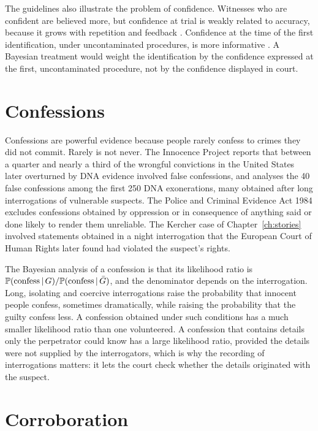 The guidelines also illustrate the problem of confidence. Witnesses who are confident are believed more, but confidence at trial is weakly related to accuracy, because it grows with repetition and feedback \citep{wells1998}. Confidence at the time of the first identification, under uncontaminated procedures, is more informative \citep{wixted2017}. A Bayesian treatment would weight the identification by the confidence expressed at the first, uncontaminated procedure, not by the confidence displayed in court.

\section{Confessions}

Confessions are powerful evidence because people rarely confess to crimes they did not commit. Rarely is not never. The Innocence Project reports that between a quarter and nearly a third of the wrongful convictions in the United States later overturned by DNA evidence involved false confessions, and \citet{garrett2010} analyses the 40 false confessions among the first 250 DNA exonerations, many obtained after long interrogations of vulnerable suspects. The Police and Criminal Evidence Act 1984 excludes confessions obtained by oppression or in consequence of anything said or done likely to render them unreliable. The Kercher case of Chapter~\ref{ch:stories} involved statements obtained in a night interrogation that the European Court of Human Rights later found had violated the suspect's rights.

The Bayesian analysis of a confession is that its likelihood ratio is $\mathbb{P}(\text{confess}\,\vert\, G)/\mathbb{P}(\text{confess}\,\vert\,\bar G)$, and the denominator depends on the interrogation. Long, isolating and coercive interrogations raise the probability that innocent people confess, sometimes dramatically, while raising the probability that the guilty confess less. A confession obtained under such conditions has a much smaller likelihood ratio than one volunteered. A confession that contains details only the perpetrator could know has a large likelihood ratio, provided the details were not supplied by the interrogators, which is why the recording of interrogations matters: it lets the court check whether the details originated with the suspect.

\section{Corroboration}

